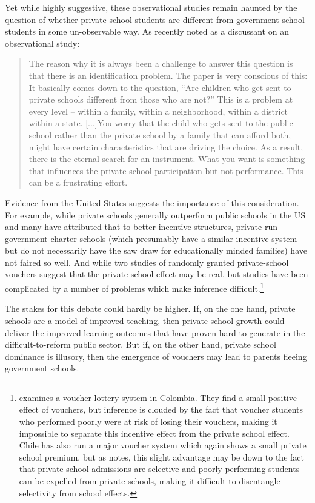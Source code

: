 \documentclass[12pt]{article}
\begin{document}
Yet while highly suggestive, these observational studies remain haunted by the question of whether private school students are different from government school students in some un-observable way. As \cite{Banerjee:2009uu} recently noted as a discussant on an observational study:
\begin{quote}
	The reason why it is always been a challenge to answer this question is that there is an identification problem. The paper is very conscious of this: It basically comes down to the question, ``Are children who get sent to private schools different from those who are not?'' This is a problem at every level -- within a family, within a neighborhood, within a district within a state. [...]You worry that the child who gets sent to the public school rather than the private school by a family that can afford both, might have certain characteristics that are driving the choice. As a result, there is the eternal search for an instrument. What you want is something that influences the private school participation but not performance. This can be a frustrating effort. 
\end{quote}

Evidence from the United States suggests the importance of this consideration. For example, while private schools generally outperform public schools in the US and many have attributed that to better incentive structures, private-run government charter schools (which presumably have a similar incentive system but do not necessarily have the saw draw for educationally minded families) have not faired so well.\citep{Fuller:2002td} And while two studies of randomly granted private-school vouchers suggest that the private school effect may be real, but studies have been complicated by a number of problems which make inference difficult.\footnote{\cite{Angrist:2002up} examines a voucher lottery system in Colombia. They find a small positive effect of vouchers, but inference is clouded by the fact that voucher students who performed poorly were at risk of losing their vouchers, making it impossible to separate this incentive effect from the private school effect. Chile has also run a major voucher system which again shows a small private school premium, but as \cite{Bellei:2008uu} notes, this slight advantage may be down to the fact that private school admissions are selective and poorly performing students can be expelled from private schools, making it difficult to disentangle selectivity from school effects.}

The stakes for this debate could hardly be higher. If, on the one hand, private schools are a model of improved teaching, then private school growth could deliver the improved learning outcomes that have proven hard to generate in the difficult-to-reform public sector. But if, on the other hand, private school dominance is illusory, then the emergence of vouchers may lead to parents fleeing government schools. 
\end{document}
